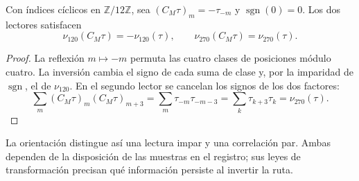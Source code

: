 \begin{proposition}
Con índices cíclicos en \(\mathbb Z/12\mathbb Z\), sea
\((C_M\tau)_m=-\tau_{-m}\) y \(\operatorname{sgn}(0)=0\).
Los dos lectores satisfacen
\[
 \nu_{120}(C_M\tau)=-\nu_{120}(\tau),\qquad
 \nu_{270}(C_M\tau)=\nu_{270}(\tau).
\]
\end{proposition}
\begin{proof}
La reflexión \(m\mapsto-m\) permuta las cuatro clases de posiciones
módulo cuatro. La inversión cambia el signo de cada suma de clase y,
por la imparidad de \(\operatorname{sgn}\), el de \(\nu_{120}\).
En el segundo lector se cancelan los signos de los dos factores:
\[
 \sum_m(C_M\tau)_m(C_M\tau)_{m+3}
 =\sum_m\tau_{-m}\tau_{-m-3}
 =\sum_k\tau_{k+3}\tau_k
 =\nu_{270}(\tau).
\]
\end{proof}
La orientación distingue así una lectura impar y una correlación par.
Ambas dependen de la disposición de las muestras en el registro; sus
leyes de transformación precisan qué información persiste al invertir
la ruta.
